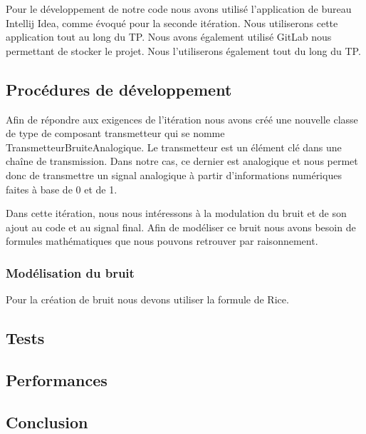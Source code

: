 Pour le développement de notre code nous avons utilisé l'application de bureau Intellij Idea, comme évoqué pour la seconde itération. Nous utiliserons cette application tout au long du TP. Nous avons également utilisé GitLab nous permettant de stocker le projet. Nous l'utiliserons également tout du long du TP.

\subsection{Procédures de développement}

Afin de répondre aux exigences de l'itération nous avons créé une nouvelle classe de type de composant transmetteur qui se nomme TransmetteurBruiteAnalogique. Le transmetteur est un élément clé dans une chaîne de transmission. Dans notre cas, ce dernier est analogique et nous permet donc de transmettre un signal analogique à partir d'informations numériques faites à base de 0 et de 1.

Dans cette itération, nous nous intéressons à la modulation du bruit et de son ajout au code et au signal final. Afin de modéliser ce bruit nous avons besoin de formules mathématiques que nous pouvons retrouver par raisonnement.

\subsubsection{Modélisation du bruit}
Pour la création de bruit nous devons utiliser la formule de Rice.

\subsection{Tests}

\subsection{Performances}

\subsection{Conclusion}